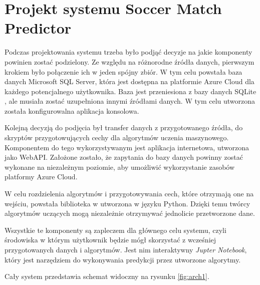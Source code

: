 \chapter{Projekt systemu Soccer Match Predictor}

\noindent Podczas projektowania systemu trzeba było podjąć decyzje na jakie komponenty powinien zostać podzielony. Ze względu na różnorodne źródła danych, pierwszym krokiem było połączenie ich w jeden spójny zbiór. W tym celu powstała baza danych Microsoft SQL Server, która jest dostępna na platformie Azure Cloud dla każdego potencjalnego użytkownika. Baza jest przeniesiona z bazy danych SQLite \cite{kagggle_european_soccer_database}, ale musiała zostać uzupełniona innymi źródłami danych. W tym celu utworzona została konfigurowalna aplikacja konsolowa.

Kolejną decyzją do podjęcia był transfer danych z przygotowanego źródła, do skryptów przygotowujących cechy dla algorytmów uczenia maszynowego. Komponentem do tego wykorzystywanym jest aplikacja internetowa, utworzona jako WebAPI. Założone zostało, że zapytania do bazy danych powinny zostać wykonane na niezależnym poziomie, aby umożliwić wykorzystanie zasobów platformy Azure Cloud.

W celu rozdzielenia algorytmów i przygotowywania cech, które otrzymają one na wejściu, powstała biblioteka w utworzona w języku Python. Dzięki temu twórcy algorytmów uczących mogą niezależnie otrzymywać jednolicie przetworzone dane.

Wszystkie te komponenty są zapleczem dla głównego celu systemu, czyli środowiska w którym użytkownik będzie mógł skorzystać z wcześniej przygotowanych danych i algorytmów. Jest nim interaktywny \textit{Jupter Notebook}, który jest narzędziem do wykonywania predykcji przez utworzone algorytmy.

Cały system przedstawia schemat widoczny na rysunku \ref{fig:arch1}.
\newpage

